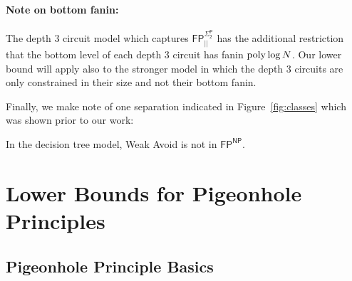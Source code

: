 \paragraph{Note on bottom fanin:} The depth 3 circuit model which captures $\mathsf{FP^{\Sigma_2^P}_{||}}$ has the additional restriction that the bottom level of each depth 3 circuit has fanin $\mathrm{poly}\log N$. Our lower bound will apply also to the stronger model in which the depth 3 circuits are only constrained in their size and not their bottom fanin.

Finally, we make note of one separation indicated in Figure~\ref{fig:classes} which was shown prior to our work:
\begin{lemma*}
In the decision tree model, {\sc Weak Avoid} is not in $\mathsf{FP^{NP}}$.
\end{lemma*}

\section{Lower Bounds for Pigeonhole Principles}
\subsection{Pigeonhole Principle Basics}
\label{sec:php-basics}



